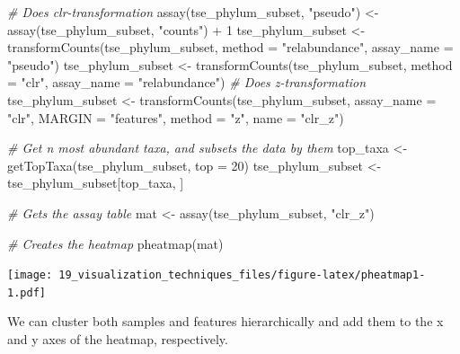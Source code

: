 \documentclass[
]{book}
\newenvironment{Shaded}{\begin{snugshade}}{\end{snugshade}}
\newcommand{\AttributeTok}[1]{\textcolor[rgb]{0.77,0.63,0.00}{#1}}
\newcommand{\CommentTok}[1]{\textcolor[rgb]{0.56,0.35,0.01}{\textit{#1}}}
\newcommand{\DecValTok}[1]{\textcolor[rgb]{0.00,0.00,0.81}{#1}}
\newcommand{\FunctionTok}[1]{\textcolor[rgb]{0.00,0.00,0.00}{#1}}
\newcommand{\NormalTok}[1]{#1}
\newcommand{\OtherTok}[1]{\textcolor[rgb]{0.56,0.35,0.01}{#1}}
\newcommand{\SpecialCharTok}[1]{\textcolor[rgb]{0.00,0.00,0.00}{#1}}
\newcommand{\StringTok}[1]{\textcolor[rgb]{0.31,0.60,0.02}{#1}}
\begin{document}
\begin{Shaded}
\begin{Highlighting}[]
\CommentTok{\# Does clr{-}transformation}
\FunctionTok{assay}\NormalTok{(tse\_phylum\_subset, }\StringTok{"pseudo"}\NormalTok{) }\OtherTok{\textless{}{-}} \FunctionTok{assay}\NormalTok{(tse\_phylum\_subset, }\StringTok{"counts"}\NormalTok{) }\SpecialCharTok{+} \DecValTok{1}
\NormalTok{tse\_phylum\_subset }\OtherTok{\textless{}{-}} \FunctionTok{transformCounts}\NormalTok{(tse\_phylum\_subset, }\AttributeTok{method =} \StringTok{"relabundance"}\NormalTok{,}
                                     \AttributeTok{assay\_name =} \StringTok{"pseudo"}\NormalTok{)}
\NormalTok{tse\_phylum\_subset }\OtherTok{\textless{}{-}} \FunctionTok{transformCounts}\NormalTok{(tse\_phylum\_subset, }\AttributeTok{method =} \StringTok{"clr"}\NormalTok{,}
                                     \AttributeTok{assay\_name =} \StringTok{"relabundance"}\NormalTok{)}
\CommentTok{\# Does z{-}transformation}
\NormalTok{tse\_phylum\_subset }\OtherTok{\textless{}{-}} \FunctionTok{transformCounts}\NormalTok{(tse\_phylum\_subset, }\AttributeTok{assay\_name =} \StringTok{"clr"}\NormalTok{,}
                                     \AttributeTok{MARGIN =} \StringTok{"features"}\NormalTok{, }
                                     \AttributeTok{method =} \StringTok{"z"}\NormalTok{, }\AttributeTok{name =} \StringTok{"clr\_z"}\NormalTok{)}

\CommentTok{\# Get n most abundant taxa, and subsets the data by them}
\NormalTok{top\_taxa }\OtherTok{\textless{}{-}} \FunctionTok{getTopTaxa}\NormalTok{(tse\_phylum\_subset, }\AttributeTok{top =} \DecValTok{20}\NormalTok{)}
\NormalTok{tse\_phylum\_subset }\OtherTok{\textless{}{-}}\NormalTok{ tse\_phylum\_subset[top\_taxa, ]}

\CommentTok{\# Gets the assay table}
\NormalTok{mat }\OtherTok{\textless{}{-}} \FunctionTok{assay}\NormalTok{(tse\_phylum\_subset, }\StringTok{"clr\_z"}\NormalTok{)}

\CommentTok{\# Creates the heatmap}
\FunctionTok{pheatmap}\NormalTok{(mat)}
\end{Highlighting}
\end{Shaded}

\texttt{[image: 19\_visualization\_techniques\_files/figure-latex/pheatmap1-1.pdf]}

We can cluster both samples and features hierarchically and add them to the
x and y axes of the heatmap, respectively.
\end{document}

